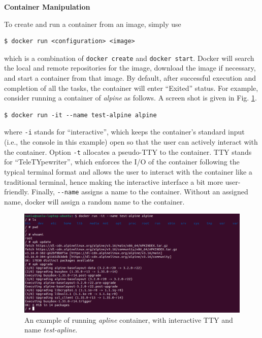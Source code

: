 \vspace{0.1in}
\noindent \textbf{Container Manipulation}
\vspace{0.1in}

To create and run a container from an image, simply use
\begin{lstlisting}
$ docker run <configuration> <image>
\end{lstlisting}
which is a combination of \verb|docker create| and \verb|docker start|. Docker will search the local and remote repositories for the image, download the image if necessary, and start a container from that image. By default, after successful execution and completion of all the tasks, the container will enter ``Exited'' status. For example, consider running a container of \textit{alpine} as follows. A screen shot is given in Fig. \ref{ch:vac:fig:dockerrunexp}.
\begin{lstlisting}
$ docker run -it --name test-alpine alpine
\end{lstlisting}
where \verb|-i| stands for ``interactive'', which keeps the container's standard input (i.e., the console in this example) open so that the user can actively interact with the container. Option \verb|-t| allocates a pseudo-TTY to the container. TTY stands for ``TeleTYpewriter'', which enforces the I/O of the container following the typical terminal format and allows the user to interact with the container like a traditional terminal, hence making the interactive interface a bit more user-friendly. Finally, \verb|--name| assigns a name to the container. Without an assigned name, docker will assign a random name to the container.
\begin{figure}
	\centering
	\includegraphics[width=350pt]{chapters/ch-virtualization-and-containerization/figures/dockerrunexp.png}
	\caption{An example of running \textit{apline} container, with interactive TTY and name \textit{test-apline}.} \label{ch:vac:fig:dockerrunexp}
\end{figure}


